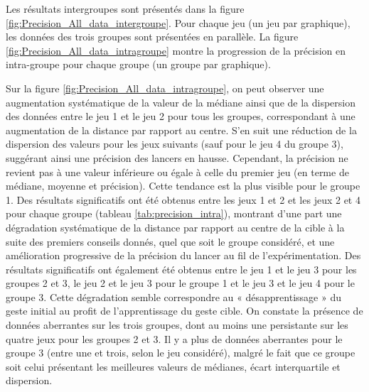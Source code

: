 \begin{table}[]
\small
{}
\caption{Moyennes et écarts-types des données des apprenants (distance au centre de la cible).}
\label{tab:moy_std_precision}
\end{table}

Les résultats intergroupes sont présentés dans la figure \ref{fig:Precision_All_data_intergroupe}. Pour chaque jeu (un jeu par graphique), les données des trois groupes sont présentées en parallèle. La figure \ref{fig:Precision_All_data_intragroupe} montre la progression de la précision en intra-groupe pour chaque groupe (un groupe par graphique).

Sur la figure \ref{fig:Precision_All_data_intragroupe}, on peut observer une augmentation systématique de la valeur de la médiane ainsi que de la dispersion des données entre le jeu 1 et le jeu 2 pour tous les groupes, correspondant à une augmentation de la distance par rapport au centre. S'en suit une réduction de la dispersion des valeurs pour les jeux suivants (sauf pour le jeu 4 du groupe 3), suggérant ainsi une précision des lancers en hausse. Cependant, la précision ne revient pas à une valeur inférieure ou égale à celle du premier jeu (en terme de médiane, moyenne et précision). Cette tendance est la plus visible pour le groupe 1. Des résultats significatifs ont été obtenus entre les jeux 1 et 2 et les jeux 2 et 4 pour chaque groupe (tableau \ref{tab:precision_intra}), montrant d'une part une dégradation systématique de la distance par rapport au centre de la cible à la suite des premiers conseils donnés, quel que soit le groupe considéré, et une amélioration progressive de la précision du lancer au fil de l'expérimentation. Des résultats significatifs ont également été obtenus entre le jeu 1 et le jeu 3 pour les groupes 2 et 3, le jeu 2 et le jeu 3 pour le groupe 1 et le jeu 3 et le jeu 4 pour le groupe 3. Cette dégradation semble correspondre au « désapprentissage » du geste initial au profit de l'apprentissage du geste cible. On constate la présence de données aberrantes sur les trois groupes, dont au moins une persistante sur les quatre jeux pour les groupes 2 et 3. Il y a plus de données aberrantes pour le groupe 3 (entre une et trois, selon le jeu considéré), malgré le fait que ce groupe soit celui présentant les meilleures valeurs de médianes, écart interquartile et dispersion.


